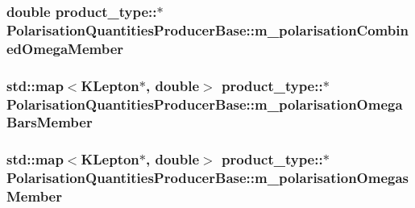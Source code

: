 \label{classPolarisationQuantitiesProducerBase_a19d47f90ed7769fa7114c07afb383937}
\hypertarget{classPolarisationQuantitiesProducerBase_ab4041d5aa4185afb505947442aedd23a}{
\subsubsection[{m\_\-polarisationCombinedOmegaMember}]{\setlength{\rightskip}{0pt plus 5cm}double product\_\-type::$\ast$ {\bf PolarisationQuantitiesProducerBase::m\_\-polarisationCombinedOmegaMember}}}
\label{classPolarisationQuantitiesProducerBase_ab4041d5aa4185afb505947442aedd23a}
\hypertarget{classPolarisationQuantitiesProducerBase_a5b31ced54f7c19434ec5d108a07a1692}{
\subsubsection[{m\_\-polarisationOmegaBarsMember}]{\setlength{\rightskip}{0pt plus 5cm}std::map$<$KLepton$\ast$, double$>$ product\_\-type::$\ast$ {\bf PolarisationQuantitiesProducerBase::m\_\-polarisationOmegaBarsMember}}}
\label{classPolarisationQuantitiesProducerBase_a5b31ced54f7c19434ec5d108a07a1692}
\hypertarget{classPolarisationQuantitiesProducerBase_a171e0552f9f8eff15e55460044e0910f}{
\subsubsection[{m\_\-polarisationOmegasMember}]{\setlength{\rightskip}{0pt plus 5cm}std::map$<$KLepton$\ast$, double$>$ product\_\-type::$\ast$ {\bf PolarisationQuantitiesProducerBase::m\_\-polarisationOmegasMember}}}
\label{classPolarisationQuantitiesProducerBase_a171e0552f9f8eff15e55460044e0910f}


